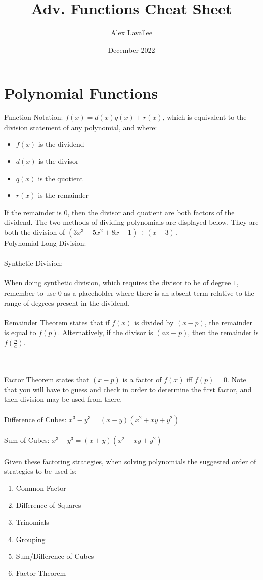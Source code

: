 \documentclass{article}
\title{Adv. Functions Cheat Sheet}
\author{Alex Lavallee }
\date{December 2022}
\begin{document}


\maketitle

\section{Polynomial Functions}
Function Notation: $f(x)=d(x)q(x)+r(x)$, which is equivalent to the division statement of any polynomial, and where: \begin{itemize}
    \item $f(x)$ is the dividend
    \item $d(x)$ is the divisor
    \item $q(x)$ is the quotient
    \item $r(x)$ is the remainder
\end{itemize}

If the remainder is $0$, then the divisor and quotient are both factors of the dividend. The two methods of dividing polynomials are displayed below. They are both the division of $(3x^3-5x^2+8x-1) \div (x-3)$. \\

Polynomial Long Division: 
 \\
\\Synthetic Division:
 \\
\\When doing synthetic division, which requires the divisor to be of degree $1$, remember to use $0$ as a placeholder where there is an absent term relative to the range of degrees present in the dividend. \\ \\

Remainder Theorem states that if $f(x)$ is divided by $(x-p)$, the remainder is equal to $f(p)$. Alternatively, if the divisor is $(ax-p)$, then the remainder is $f(\frac{p}{a})$. \\ \\\

Factor Theorem states that $(x-p)$ is a factor of $f(x)$ iff $f(p)=0$. Note that you will have to guess and check in order to determine the first factor, and then division may be used from there. \\ \\

Difference of Cubes: $x^3-y^3=(x-y)(x^2+xy+y^2)$ \\ \\
Sum of Cubes: $x^3+y^3=(x+y)(x^2-xy+y^2)$ \\ \\

Given these factoring strategies, when solving polynomials the suggested order of strategies to be used is: \begin{enumerate}
    \item Common Factor
    \item Difference of Squares
    \item Trinomials
    \item Grouping
    \item Sum/Difference of Cubes
    \item Factor Theorem
\end{enumerate}
\end{document}
